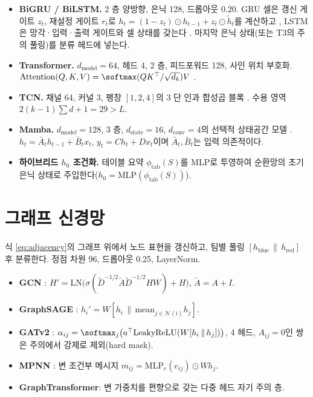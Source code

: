 \begin{itemize}[leftmargin=1.5em]
  \item \textbf{BiGRU / BiLSTM.} 2 층 양방향, 은닉 128, 드롭아웃 0.20. GRU 셀은 갱신 게이트 $z_t$, 재설정 게이트 $r_t$로 $h_t = (1-z_t)\odot h_{t-1} + z_t \odot \tilde h_t$를 계산하고 \cite{cho2014learning}, LSTM은 망각·입력·출력 게이트와 셀 상태를 갖는다 \cite{hochreiter1997long}. 마지막 은닉 상태(또는 T3의 주의 풀링)를 분류 헤드에 넣는다.
  \item \textbf{Transformer.} $d_{\mathrm{model}} = 64$, 헤드 4, 2 층, 피드포워드 128, 사인 위치 부호화. $\mathrm{Attention}(Q,K,V) = \softmax(QK^\top/\sqrt{d_k})V$ \cite{vaswani2017attention}.
  \item \textbf{TCN.} 채널 64, 커널 3, 팽창 $[1,2,4]$의 3 단 인과 합성곱 블록 \cite{bai2018empirical}. 수용 영역 $2(k-1)\sum d + 1 = 29 > L$.
  \item \textbf{Mamba.} $d_{\mathrm{model}} = 128$, 3 층, $d_{\mathrm{state}} = 16$, $d_{\mathrm{conv}} = 4$의 선택적 상태공간 모델 \cite{gu2023mamba}. $h_t = \bar A_t h_{t-1} + \bar B_t x_t$, $y_t = C h_t + D x_t$이며 $\bar A_t, \bar B_t$는 입력 의존적이다.
  \item \textbf{하이브리드 $h_0$ 조건화.} 테이블 요약 $\phi_{\mathrm{tab}}(S)$를 MLP로 투영하여 순환망의 초기 은닉 상태로 주입한다($h_0 = \mathrm{MLP}(\phi_{\mathrm{tab}}(S))$).
\end{itemize}

\section{그래프 신경망}
\label{sec:model-gnn}

식 \eqref{eq:adjacency}의 그래프 위에서 노드 표현을 갱신하고, 팀별 풀링 $[h_{\mathrm{blue}} \,\|\, h_{\mathrm{red}}]$ 후 분류한다. 정점 차원 96, 드롭아웃 0.25, LayerNorm.

\begin{itemize}[leftmargin=1.5em]
  \item \textbf{GCN} \cite{kipf2017semi}: $H' = \mathrm{LN}\big(\sigma(\tilde D^{-1/2}\tilde A\tilde D^{-1/2} H W) + H\big)$, $\tilde A = A + I$.
  \item \textbf{GraphSAGE} \cite{hamilton2017inductive}: $h_i' = W[h_i \,\|\, \mathrm{mean}_{j \in \mathcal{N}(i)} h_j]$.
  \item \textbf{GATv2} \cite{brody2022how}: $\alpha_{ij} = \softmax_j\big(a^\top \mathrm{LeakyReLU}(W[h_i \,\|\, h_j])\big)$, 4 헤드, $A_{ij} = 0$인 쌍은 주의에서 강제로 제외(hard mask).
  \item \textbf{MPNN} \cite{gilmer2017neural}: 변 조건부 메시지 $m_{ij} = \mathrm{MLP}_e(e_{ij}) \odot W h_j$.
  \item \textbf{GraphTransformer}: 변 가중치를 편향으로 갖는 다중 헤드 자기 주의 층.
\end{itemize}

